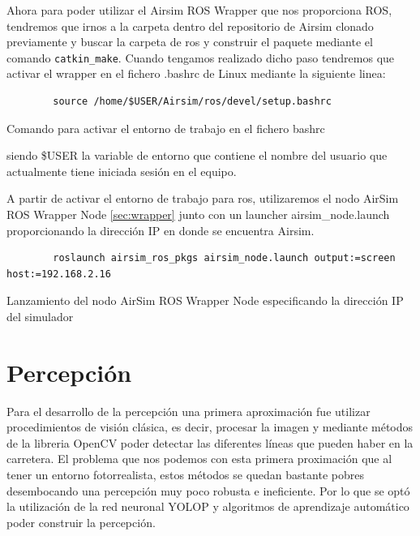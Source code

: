 \begin{enumerate}
    Ahora para poder utilizar el Airsim ROS Wrapper que nos proporciona ROS, tendremos que irnos a la carpeta dentro del repositorio de Airsim clonado previamente y buscar la carpeta de ros y construir el paquete 
    mediante el comando \texttt{catkin\_make}. Cuando tengamos realizado dicho paso tendremos que activar el wrapper en el fichero .bashrc de Linux mediante la siguiente linea: \newline

    \begin{code}  [H]
      \begin{lstlisting}
        source /home/$USER/Airsim/ros/devel/setup.bashrc
      \end{lstlisting}
      \caption[bash]{Comando para activar el entorno de trabajo en el fichero bashrc}
      \label{cod:bashrc}
    \end{code} 


     siendo \$USER la variable de entorno que contiene el nombre del usuario que actualmente tiene iniciada sesión en el equipo.

     A partir de activar el entorno de trabajo para ros, utilizaremos el nodo AirSim ROS Wrapper Node \ref{sec:wrapper} junto con un launcher airsim\_node.launch proporcionando
     la dirección IP en donde se encuentra Airsim.\newline

     \begin{code}  [H]
      \begin{lstlisting}
        roslaunch airsim_ros_pkgs airsim_node.launch output:=screen host:=192.168.2.16
      \end{lstlisting}
      \caption[comando]{Lanzamiento del nodo AirSim ROS Wrapper Node especificando la dirección IP del simulador}
      \label{cod:roslaunch}
    \end{code} 

  \end{enumerate}

\section{Percepción}
\label{sec:Percepción}
Para el desarrollo de la percepción una primera aproximación fue utilizar
procedimientos de visión clásica, es decir, procesar la imagen y mediante métodos de la libreria OpenCV
poder detectar las diferentes líneas que pueden haber en la carretera. El problema que nos podemos con esta primera proximación que al tener un 
entorno fotorrealista, estos métodos se quedan bastante pobres desembocando una percepción muy poco robusta e ineficiente. Por lo que se optó la utilización
de la red neuronal YOLOP y algoritmos de aprendizaje automático poder construir la percepción. \newline

